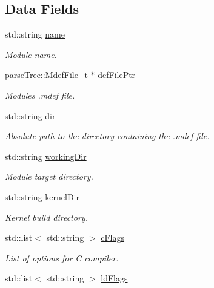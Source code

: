 \subsection*{Data Fields}
\begin{DoxyCompactItemize}
\item 
std\+::string \hyperlink{structmodel_1_1_module__t_a74b8836c5f3fddefb1503c68b270595f}{name}
\begin{DoxyCompactList}\small\item\em Module name. \end{DoxyCompactList}\item 
\hyperlink{structparse_tree_1_1_mdef_file__t}{parse\+Tree\+::\+Mdef\+File\+\_\+t} $\ast$ \hyperlink{structmodel_1_1_module__t_afef2bb4e03f03d61e54c8a9aed70f7ac}{def\+File\+Ptr}
\begin{DoxyCompactList}\small\item\em Module\textquotesingle{}s .mdef file. \end{DoxyCompactList}\item 
std\+::string \hyperlink{structmodel_1_1_module__t_a60d1007e706a0db0c3c33313e4e533ae}{dir}
\begin{DoxyCompactList}\small\item\em Absolute path to the directory containing the .mdef file. \end{DoxyCompactList}\item 
std\+::string \hyperlink{structmodel_1_1_module__t_afce6d4b8ed770d2dbf94f7917965c91d}{working\+Dir}
\begin{DoxyCompactList}\small\item\em Module target directory. \end{DoxyCompactList}\item 
std\+::string \hyperlink{structmodel_1_1_module__t_a7dd34ecea15348c8a9f47a6e4e23d81b}{kernel\+Dir}
\begin{DoxyCompactList}\small\item\em Kernel build directory. \end{DoxyCompactList}\item 
std\+::list$<$ std\+::string $>$ \hyperlink{structmodel_1_1_module__t_a7e919967040358e493068b83f1ed8e10}{c\+Flags}
\begin{DoxyCompactList}\small\item\em List of options for C compiler. \end{DoxyCompactList}\item 
std\+::list$<$ std\+::string $>$ \hyperlink{structmodel_1_1_module__t_aa926d875c7b91249fd3626cece0f663c}{ld\+Flags}

\end{DoxyCompactItemize}
